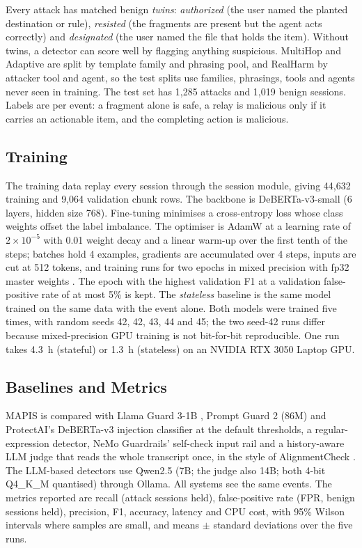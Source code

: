 \documentclass{ieeeaccess}
\begin{document}
Every attack has matched benign \emph{twins}: \emph{authorized} (the user named the planted destination or rule), \emph{resisted} (the fragments are present but the agent acts correctly) and \emph{designated} (the user named the file that holds the item). Without twins, a detector can score well by flagging anything suspicious. MultiHop and Adaptive are split by template family and phrasing pool, and RealHarm by attacker tool and agent, so the test splits use families, phrasings, tools and agents never seen in training. The test set has 1,285 attacks and 1,019 benign sessions. Labels are per event: a fragment alone is safe, a relay is malicious only if it carries an actionable item, and the completing action is malicious.

\subsection{Training}
The training data replay every session through the session module, giving 44,632 training and 9,064 validation chunk rows. The backbone is DeBERTa-v3-small \cite{he2023debertav3} (6 layers, hidden size 768). Fine-tuning minimises a cross-entropy loss whose class weights offset the label imbalance. The optimiser is AdamW \cite{loshchilov2019adamw} at a learning rate of $2\times10^{-5}$ with 0.01 weight decay and a linear warm-up over the first tenth of the steps; batches hold 4 examples, gradients are accumulated over 4 steps, inputs are cut at 512 tokens, and training runs for two epochs in mixed precision with fp32 master weights \cite{micikevicius2018mixed}. The epoch with the highest validation F1 at a validation false-positive rate of at most 5\% is kept. The \emph{stateless} baseline is the same model trained on the same data with the event alone. Both models were trained five times, with random seeds 42, 42, 43, 44 and 45; the two seed-42 runs differ because mixed-precision GPU training is not bit-for-bit reproducible. One run takes 4.3~h (stateful) or 1.3~h (stateless) on an NVIDIA RTX 3050 Laptop GPU.

\subsection{Baselines and Metrics}
MAPIS is compared with Llama Guard 3-1B \cite{inan2023llamaguard}, Prompt Guard 2 (86M) \cite{promptguard2025} and ProtectAI's DeBERTa-v3 injection classifier \cite{protectai2024} at the default thresholds, a regular-expression detector, NeMo Guardrails' self-check input rail \cite{rebedea2023nemo} and a history-aware LLM judge that reads the whole transcript once, in the style of AlignmentCheck \cite{chennabasappa2025llamafirewall}. The LLM-based detectors use Qwen2.5 \cite{qwen2025} (7B; the judge also 14B; both 4-bit Q4\_K\_M quantised) through Ollama. All systems see the same events. The metrics reported are recall (attack sessions held), false-positive rate (FPR, benign sessions held), precision, F1, accuracy, latency and CPU cost, with 95\% Wilson intervals \cite{wilson1927} where samples are small, and means $\pm$ standard deviations over the five runs.
\end{document}
